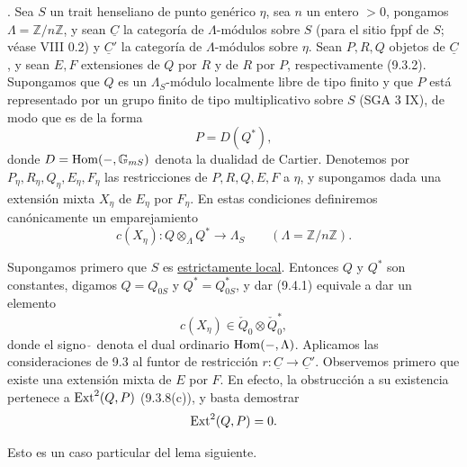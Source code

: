 

\medskip
{}. Sea $S$ un trait henseliano de punto genérico $\eta$, sea $n$ un
entero $>0$, pongamos $\Lambda=\mathbb Z/n\mathbb Z$, y sean
$\underline C$ la categoría de $\Lambda$-módulos sobre $S$ (para el
sitio fppf de $S$; véase VIII 0.2) y $\underline C'$ la categoría de
$\Lambda$-módulos sobre $\eta$. Sean $P,R,Q$ objetos de $\underline C$,
y sean $E,F$ extensiones de $Q$ por $R$ y de $R$ por $P$,
respectivamente (9.3.2). Supongamos que $Q$ es un $\Lambda_S$-módulo
localmente libre de tipo finito y que $P$ está representado por un grupo
finito de tipo multiplicativo sobre $S$ (SGA 3 IX), de modo que es de la
forma
\begin{equation*}
 P=D(Q^*),
\end{equation*}
donde $D=\operatorname{Hom}(-,\mathbb G_{mS})$ denota la dualidad de
Cartier. Denotemos por $P_\eta,R_\eta,Q_\eta,E_\eta,F_\eta$ las
restricciones de $P,R,Q,E,F$ a $\eta$, y supongamos dada una extensión
mixta $X_\eta$ de $E_\eta$ por $F_\eta$. En estas condiciones definiremos
canónicamente un emparejamiento
\begin{equation}\tag{9.4.1}
 c(X_\eta):Q\otimes_\Lambda Q^*\longrightarrow\Lambda_S
 \qquad(\Lambda=\mathbb Z/n\mathbb Z).
\end{equation}

Supongamos primero que $S$ es \underline{estrictamente local}. Entonces
$Q$ y $Q^*$ son constantes, digamos $Q=Q_{0S}$ y $Q^*=Q^*_{0S}$, y dar
(9.4.1) equivale a dar un elemento
\begin{equation}\tag{9.4.2}
 c(X_\eta)\in\check Q_0\otimes\check Q_0^*,
\end{equation}
donde el signo $\check{\ }$ denota el dual ordinario
$\operatorname{Hom}(-,\Lambda)$. Aplicamos las consideraciones de 9.3 al funtor de
restricción $r:\underline C\longrightarrow\underline C'$. Observemos
primero que existe una extensión mixta de $E$ por $F$. En efecto, la
obstrucción a su existencia pertenece a $\operatorname{Ext}^2(Q,P)$ (9.3.8(c)), y
basta demostrar
\begin{equation*}
 \operatorname{Ext}^2(Q,P)=0.
\end{equation*}

Esto es un caso particular del lema siguiente.

